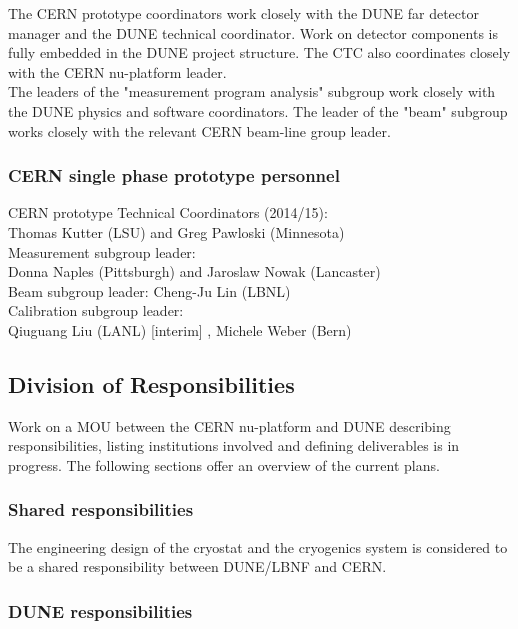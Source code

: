 The CERN prototype coordinators work closely with the DUNE far detector manager and the DUNE technical coordinator. 
Work on detector components is fully embedded in the DUNE project structure. The CTC also coordinates closely with the CERN nu-platform
leader.\\
The leaders of the "measurement program analysis" subgroup work closely with the DUNE physics and software coordinators.
The leader of the "beam" subgroup works closely with the relevant CERN beam-line group leader.


\subsubsection{CERN single phase prototype personnel}

CERN prototype  Technical Coordinators (2014/15):\\
 Thomas Kutter (LSU) and Greg Pawloski (Minnesota)\\
 
 Measurement subgroup leader: \\
 \indent Donna Naples (Pittsburgh) and Jaroslaw Nowak (Lancaster)\\
 
 Beam subgroup leader: Cheng-Ju Lin (LBNL)\\

Calibration subgroup leader: \\
\indent  Qiuguang Liu (LANL) [interim] , Michele Weber (Bern)\\


\subsection{Division of Responsibilities}

Work on a MOU between the CERN nu-platform and DUNE describing responsibilities, listing institutions involved and defining deliverables is in progress. The following sections offer an overview of the current plans.

\subsubsection{Shared responsibilities}

The engineering design of the cryostat and the cryogenics system is considered to be a shared responsibility between DUNE/LBNF and CERN.

\subsubsection{DUNE responsibilities}

